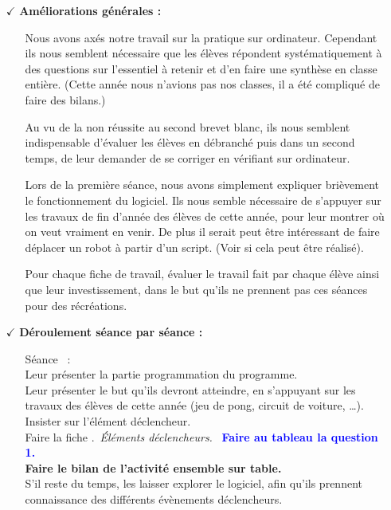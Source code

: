 \documentclass[12pt,a4paper]{article} %
\newcounter{num}
\newcommand{\seance}{\stepcounter{num} Séance \thenum \, : \\}
\newcounter{fiche}
\newcommand{\fiche}{\stepcounter{fiche} Faire la fiche \thefiche. \,}
\begin{document}
\begin{itemize}
\item[$\checkmark$]
\textbf{Améliorations générales :}
\begin{itemize}
\item[\textbullet]
Nous avons axés notre travail sur la pratique sur ordinateur. Cependant ils nous semblent nécessaire que les élèves répondent systématiquement à des questions sur l'essentiel à retenir et d'en faire une synthèse en classe entière. (Cette année nous n'avions pas nos classes, il a été compliqué de faire des bilans.) \vspace{3pt}
\item[\textbullet]
Au vu de la non réussite au second brevet blanc, ils nous semblent indispensable d'évaluer les élèves en \og débranché \fg{} puis dans un second temps, de leur demander de se corriger en vérifiant sur ordinateur. \vspace{3pt}
\item[\textbullet]
Lors de la première séance, nous avons simplement expliquer brièvement le fonctionnement du logiciel. Ils nous semble nécessaire de s'appuyer sur les travaux de fin d'année des élèves de cette année, pour leur montrer où on veut vraiment en venir. De plus il serait peut être intéressant de faire déplacer un robot à partir d'un script. (Voir si cela peut être réalisé).
\item[\textbullet]
Pour chaque fiche de travail, évaluer le travail fait par chaque élève ainsi que leur investissement, dans le but qu'ils ne prennent pas ces séances pour des récréations.
\end{itemize} \vspace{24pt}
\item[$\checkmark$]
\textbf{Déroulement séance par séance :}
\begin{itemize}
\item[\textbullet]
\seance
Leur présenter la partie programmation du programme. \\
Leur présenter le but qu'ils devront atteindre, en s'appuyant sur les travaux des élèves de cette année (jeu de pong, circuit de voiture, \dots). \\
Insister sur l'élément déclencheur. \\
\fiche \textit{Éléments déclencheurs.} \, \textcolor{blue}{\textbf{Faire au tableau la question 1.}} \\
\textbf{Faire le bilan de l'activité ensemble sur table.} \\
S'il reste du temps, les laisser explorer le logiciel, afin qu'ils prennent connaissance des différents évènements déclencheurs. \vspace{3pt}

\end{itemize}
\end{itemize}
\end{document}
